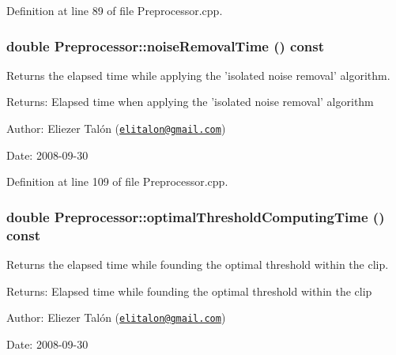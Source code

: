 Definition at line 89 of file Preprocessor.cpp.\hypertarget{class_preprocessor_0cccd23820430541f18f2b24dbfd0784}{
\subsubsection[noiseRemovalTime]{\setlength{\rightskip}{0pt plus 5cm}double Preprocessor::noiseRemovalTime () const}}
\label{class_preprocessor_0cccd23820430541f18f2b24dbfd0784}


Returns the elapsed time while applying the 'isolated noise removal' algorithm. 

\begin{Desc}
\item[Returns:]Elapsed time when applying the 'isolated noise removal' algorithm\end{Desc}
\begin{Desc}
\item[Author:]Eliezer Talón (\href{mailto:elitalon@gmail.com}{\tt elitalon@gmail.com}) \end{Desc}
\begin{Desc}
\item[Date:]2008-09-30 \end{Desc}


Definition at line 109 of file Preprocessor.cpp.\hypertarget{class_preprocessor_72dd29238c4202698e67dcb26a47f4b5}{
\subsubsection[optimalThresholdComputingTime]{\setlength{\rightskip}{0pt plus 5cm}double Preprocessor::optimalThresholdComputingTime () const}}
\label{class_preprocessor_72dd29238c4202698e67dcb26a47f4b5}


Returns the elapsed time while founding the optimal threshold within the clip. 

\begin{Desc}
\item[Returns:]Elapsed time while founding the optimal threshold within the clip\end{Desc}
\begin{Desc}
\item[Author:]Eliezer Talón (\href{mailto:elitalon@gmail.com}{\tt elitalon@gmail.com}) \end{Desc}
\begin{Desc}
\item[Date:]2008-09-30 \end{Desc}


